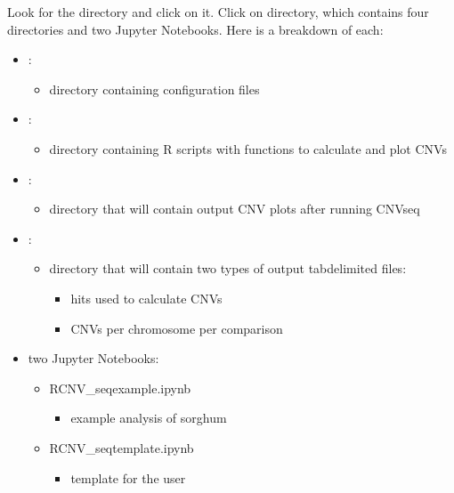 \documentclass[letterpaper,10pt,english]{sphinxhowto}
\begin{document}
Look for the directory  and click on it. Click on  directory, which contains four directories and two Jupyter Notebooks. Here is a breakdown of each:
\begin{itemize}
\item {} 
:
\begin{itemize}
\item {} 
directory containing configuration files

\end{itemize}

\item {} 
:
\begin{itemize}
\item {} 
directory containing R scripts with functions to calculate and plot CNVs

\end{itemize}

\item {} 
:
\begin{itemize}
\item {} 
directory that will contain output CNV plots after running CNV\sphinxhyphen{}seq

\end{itemize}

\item {} 
:
\begin{itemize}
\item {} 
directory that will contain two types of output tab\sphinxhyphen{}delimited files:
\begin{itemize}
\item {} 
hits used to calculate CNVs

\item {} 
CNVs per chromosome per comparison

\end{itemize}

\end{itemize}

\item {} 
two Jupyter Notebooks:
\begin{itemize}
\item {} 
RCNV\_seq\sphinxhyphen{}example.ipynb
\begin{itemize}
\item {} 
example analysis of sorghum

\end{itemize}

\item {} 
RCNV\_seq\sphinxhyphen{}template.ipynb
\begin{itemize}
\item {} 
template for the user

\end{itemize}

\end{itemize}

\end{itemize}
\end{document}
